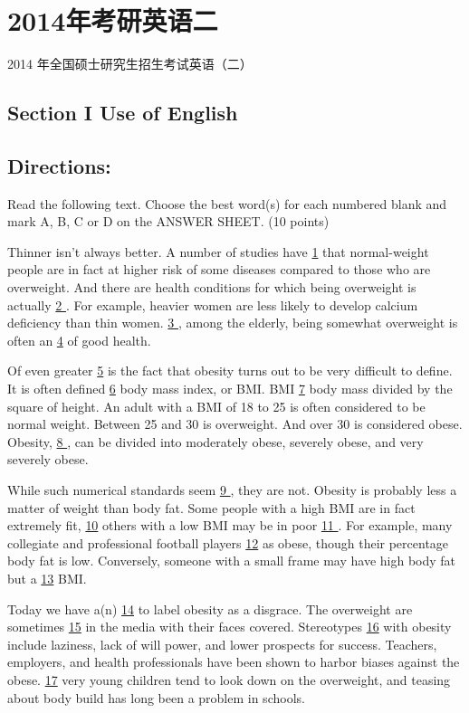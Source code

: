 \documentclass[UTF8,11pt]{ctexart}
\begin{document}
\section*{2014年考研英语二}
2014 年全国硕士研究生招生考试英语（二）


\subsection*{\textbf{Section I Use of English}}


\subsection*{\textbf{Directions:}}


Read the following text. Choose the best word(s) for each numbered blank and mark A, B, C or D on the ANSWER SHEET. (10 points)


Thinner isn’t always better. A number of studies have \uline{1} that normal-weight people are in fact at higher risk of some diseases compared to those who are overweight. And there are health conditions for which being overweight is actually \uline{2 }. For example, heavier women are less likely to develop calcium deficiency than thin women. \uline{3 }, among the elderly, being somewhat overweight is often an \uline{4} of good health.


Of even greater \uline{5} is the fact that obesity turns out to be very difficult to define. It is often defined \uline{6} body mass index, or BMI. BMI \uline{7} body mass divided by the square of height. An adult with a BMI of 18 to 25 is often considered to be normal weight. Between 25 and 30 is overweight. And over 30 is considered obese. Obesity, \uline{8 }, can be divided into moderately obese, severely obese, and very severely obese.


While such numerical standards seem \uline{9 }, they are not. Obesity is probably less a matter of weight than body fat. Some people with a high BMI are in fact extremely fit, \uline{10} others with a low BMI may be in poor \uline{11 }. For example, many collegiate and professional football players \uline{12} as obese, though their percentage body fat is low. Conversely, someone with a small frame may have high body fat but a \uline{13} BMI.


Today we have a(n) \uline{14} to label obesity as a disgrace. The overweight are sometimes \uline{15} in the media with their faces covered. Stereotypes \uline{16} with obesity include laziness, lack of will power, and lower prospects for success. Teachers, employers, and health professionals have been shown to harbor biases against the obese. \uline{17} very young children tend to look down on the overweight, and teasing about body build has long been a problem in schools.
\end{document}
